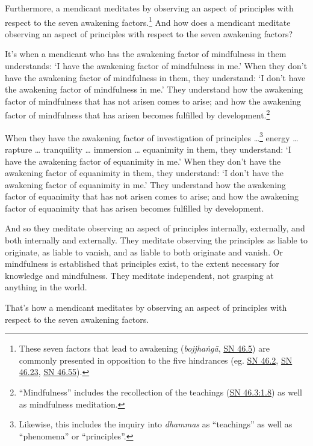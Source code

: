 \documentclass[12pt,openany]{book}%
\begin{document}
Furthermore, a mendicant meditates by observing an aspect of principles with respect to the seven awakening factors.\footnote{These seven factors that lead to awakening (\textit{\textsanskrit{bojjhaṅgā}}, \href{https://suttacentral.net/sn46.5/en/sujato}{SN 46.5}) are commonly presented in opposition to the five hindrances (eg. \href{https://suttacentral.net/sn46.2/en/sujato}{SN 46.2}, \href{https://suttacentral.net/sn46.23/en/sujato}{SN 46.23}, \href{https://suttacentral.net/sn46.55/en/sujato}{SN 46.55}). } And how does a mendicant meditate observing an aspect of principles with respect to the seven awakening factors? 

It’s when a mendicant who has the awakening factor of mindfulness in them understands: ‘I have the awakening factor of mindfulness in me.’ When they don’t have the awakening factor of mindfulness in them, they understand: ‘I don’t have the awakening factor of mindfulness in me.’ They understand how the awakening factor of mindfulness that has not arisen comes to arise; and how the awakening factor of mindfulness that has arisen becomes fulfilled by development.\footnote{“Mindfulness” includes the recollection of the teachings (\href{https://suttacentral.net/sn46.3/en/sujato\#1.8}{SN 46.3:1.8}) as well as mindfulness meditation. } 

When they have the awakening factor of investigation of principles …\footnote{Likewise, this includes the inquiry into \textit{dhammas} as “teachings” as well as “phenomena” or “principles”. } energy … rapture … tranquility … immersion … equanimity in them, they understand: ‘I have the awakening factor of equanimity in me.’ When they don’t have the awakening factor of equanimity in them, they understand: ‘I don’t have the awakening factor of equanimity in me.’ They understand how the awakening factor of equanimity that has not arisen comes to arise; and how the awakening factor of equanimity that has arisen becomes fulfilled by development. 

And so they meditate observing an aspect of principles internally, externally, and both internally and externally. They meditate observing the principles as liable to originate, as liable to vanish, and as liable to both originate and vanish. Or mindfulness is established that principles exist, to the extent necessary for knowledge and mindfulness. They meditate independent, not grasping at anything in the world. 

That’s how a mendicant meditates by observing an aspect of principles with respect to the seven awakening factors. 
\end{document}
